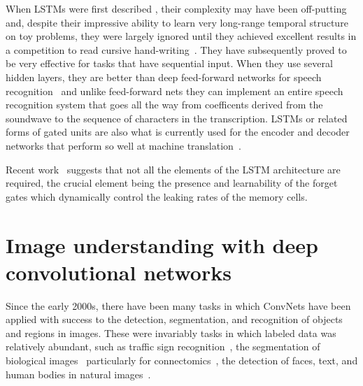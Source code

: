 \documentclass[10pts]{article}
\begin{document}
When LSTMs were first described %
\citep{Hochreiter+Schmidhuber-1997},
their complexity may have been off-putting
and, despite their impressive ability to learn very long-range temporal
structure on toy problems, they were largely ignored until they achieved
excellent results in a competition to read cursive
hand-writing~\citep{Graves-et-al-2009}. They have subsequently proved to be very
effective for tasks that have sequential input.  When they use several
hidden layers, they are better than
deep feed-forward networks for speech recognition~\citep{Graves-et-al-ICASSP2013} and
unlike feed-forward nets they can implement an entire speech recognition
system that goes all the way from coefficents derived from the soundwave to
the sequence of characters in the transcription.  LSTMs or related forms of gated
units are also what is currently used for the encoder and decoder networks that
perform so well at machine
translation~\citep{Bahdanau-et-al-arxiv2014,Sutskever-et-al-NIPS2014}.

Recent work~\citep{Chung-et-al-NIPSDL2014-small,Yao-et-al-SLU-workshop2014} 
suggests that not all the elements of the LSTM
architecture are required, the crucial element being the presence and learnability 
of the forget gates which dynamically control the leaking rates  of
the memory cells.


\section{Image understanding with deep convolutional networks}

Since the early 2000s, there have been many tasks in which ConvNets
have been applied with success to the detection, segmentation, and
recognition of objects and regions in images. These were invariably
tasks in which labeled data was relatively abundant, such as traffic
sign recognition~\cite{sermanet-ijcnn-11,Ciresan-et-al-2012}, the
segmentation of biological images~\cite{ning-05} particularly for
connectomics~\cite{Turaga2010}, the detection of faces, text, and human bodies in natural
images~\cite{vaillant-monrocq-lecun-94,nowlan-platt-95,garcia-delakis-04,osadchy-07,
nasse-09,Jain-et-al-arxiv2013,sermanet-cvpr-13,Tompson-et-al-arxiv2014}.
\end{document}
